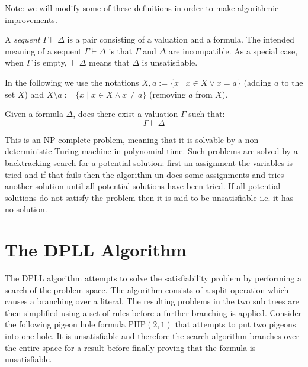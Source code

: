 \begin{mydef}[Preliminaries]
Note: we will modify some of these definitions in order to make algorithmic improvements.
\end{mydef}

%
A \emph{sequent} $\Gamma \vdash \Delta$ is a pair consisting of a valuation and a formula.
%
The intended meaning of a sequent $\Gamma \vdash \Delta$ is that $\Gamma$ and $\Delta$
are incompatible. As a special case, when $\Gamma$ is empty, $\vdash \Delta$ means that $\Delta$ is unsatisfiable. 
\begin{comment}
\begin{defi}
We define an equivalence relation $\sim$ over the formulae $\Delta_1$ and $\Delta_2$ as follows
$$\Delta_1 \sim \Delta_2 \leftrightarrow \forall C .( C \in \Delta_1 \leftrightarrow C \in \Delta_2) $$
\end{defi}
\end{comment}
%
In the following we use the notations $X,a := \{x \mid x\in X \lor x = a\}$ 
(adding $a$ to the set $X$) and 
$X\setminus a := \{x \mid x\in X \land x \neq a\}$ (removing $a$ from $X$).
%
\medskip
\begin{mydef}
Given a formula $\Delta$, does there exist a valuation $\Gamma$ such that:
$$\Gamma \models \Delta$$
\end{mydef}
This is an NP complete problem, meaning that it is solvable by a non-deterministic Turing machine in polynomial time. Such problems are solved by a backtracking search for a potential solution: first an  assignment the variables is tried and if that fails then the algorithm un-does some assignments and tries another solution until all potential solutions have been tried. If all potential solutions do not satisfy the problem then it is said to be unsatisfiable i.e. it has no solution.
\section{The DPLL Algorithm}
The DPLL algorithm attempts to solve the satisfiability problem by performing a search of the problem space. The algorithm consists of a split operation which causes a branching over a literal. The resulting problems in the two sub trees are then simplified using a set of rules before a further branching is applied. Consider the following pigeon hole formula $\mathrm{PHP}(2,1)$ that attempts to put two pigeons into one hole. It is unsatisfiable and therefore the search algorithm branches over the entire space for a result before finally proving that the formula is unsatisfiable.

